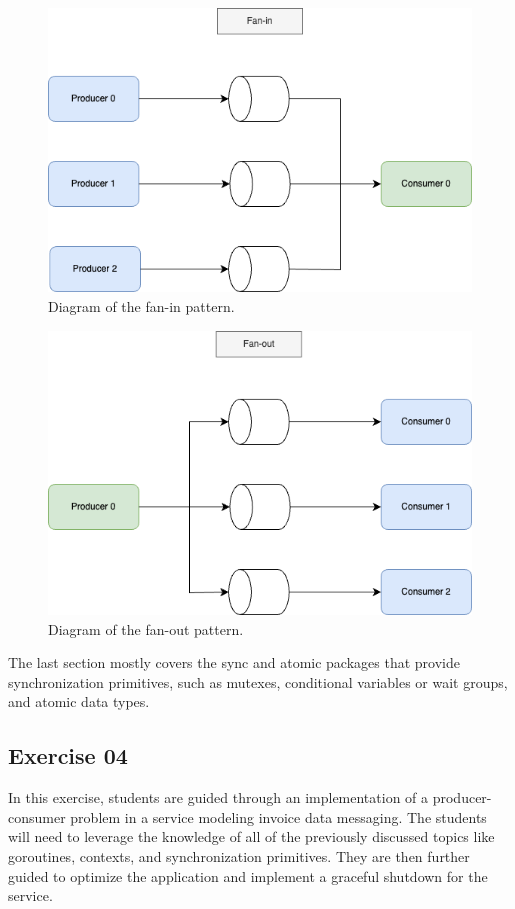 \documentclass[
  digital,
  color,
  oneside,
  nosansbold,
  nocolorbold,
  nolof,
  nolot,
]{fithesis4}
\begin{document}
\begin{figure}[H]
    \centering
    \includegraphics[width=12cm]{figures/fanin.png}
    \caption{Diagram of the fan-in pattern.}
    \label{fig:fanin}
\end{figure}

\begin{figure}[H]
    \centering
    \includegraphics[width=12cm]{figures/fanout.png}
    \caption{Diagram of the fan-out pattern.}
    \label{fig:fanout}
\end{figure}

The last section mostly covers the sync and atomic packages that provide synchronization primitives, such as mutexes, conditional variables or wait groups, and atomic data types.

\subsection{Exercise 04}

In this exercise, students are guided through an implementation of a producer-consumer problem in a service modeling invoice data messaging. The students will need to leverage the knowledge of all of the previously discussed topics like goroutines, contexts, and synchronization primitives. They are then further guided to optimize the application and implement a graceful shutdown for the service.
\end{document}
